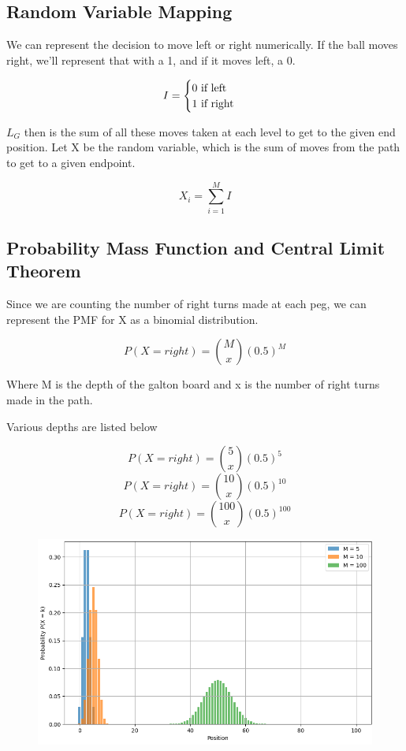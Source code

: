 \documentclass{article}
\begin{document}
\subsection{Random Variable Mapping}

We can represent the decision to move left or right numerically. If the ball moves right, we'll represent that with a 1, and if it moves left, a 0. 

 \[ I = \begin{cases} 
     $0$ \text{   if left}\\
     $1$ \text{   if right}
   \end{cases}
\]

$L_G$ then is the sum of all these moves taken at each level to get to the given end position. Let X be the random variable, which is the sum of moves from the path to get to a given endpoint.

\[X_i = \sum^{M}_{i = 1} I\]

\subsection{Probability Mass Function and Central Limit Theorem}

Since we are counting the number of right turns made at each peg, we can represent the PMF for X as a binomial distribution. 

\[P(X = right) = {M \choose x} (0.5)^M\]

Where M is the depth of the galton board and x is the number of right turns made in the path.

Various depths are listed below

\[P(X = right) = {5 \choose x} (0.5)^5\]
\[P(X = right) = {10 \choose x} (0.5)^{10}\]
\[P(X = right) = {100 \choose x} (0.5)^{100}\]

\begin{figure}[h]
\centering
\includegraphics[width=0.80\linewidth]{2.5 Graph.png}
\end{figure}
\end{document}
